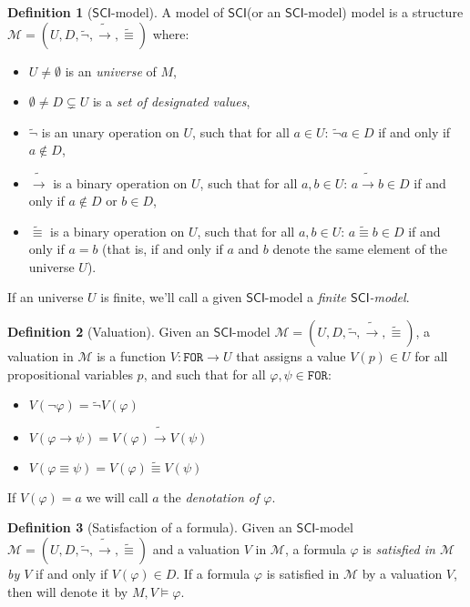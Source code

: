 \documentclass{article}
\theoremstyle{definition}
\newtheorem{definition}{Definition}[section]
\theoremstyle{definition}
\newcommand*{\id}{\equiv}
\newcommand*{\ra}{\rightarrow}
\newcommand*{\FOR}{\texttt{FOR}}
\newcommand{\SCI}{$\mathsf{SCI}$\xspace}
\begin{document}
\begin{definition}[\SCI-model]
    A model of \SCI (or an \SCI-model) model is a structure $\mathcal{M} = (U, D, \tilde{\lnot}, \tilde{\ra}, \tilde{\id})$ where:
    \begin{itemize}
        \item $U \not = \emptyset$ is an \emph{universe} of $M$,
        \item $\emptyset \not = D \subsetneq U$ is a \emph{set of designated values},
        \item $\tilde{\lnot}$ is an unary operation on $U$, such that for all $a \in U$: $\tilde{\lnot}a \in D$ if and only if $a \not \in D$,
        \item $\tilde{\ra}$ is a binary operation on $U$, such that for all $a, b \in U$: $a \tilde{\ra} b \in D$ if and only if $a \not \in D$ or $b \in D$,
        \item $\tilde{\id}$ is a binary operation on $U$, such that for all $a, b \in U$: $a \tilde{\id} b \in D$ if and only if $a = b$ (that is, if and only if $a$ and $b$ denote the same element of the universe $U$).
    \end{itemize}
    \label{model}
\end{definition}

If an universe $U$ is finite, we'll call a given \SCI-model a \emph{finite
    \SCI-model}.

\begin{definition}[Valuation]
    Given an \SCI-model $\mathcal{M} = (U, D, \tilde{\lnot}, \tilde{\ra}, \tilde{\id})$, a valuation in $\mathcal{M}$ is a function $V : \FOR \longrightarrow U$ that assigns a value $V(p) \in U$ for all propositional variables $p$, and such that for all $\varphi, \psi \in \FOR$:
    \begin{itemize}
        \item $V(\lnot \varphi) = \tilde{\lnot}V(\varphi)$
        \item $V(\varphi \ra \psi) = V(\varphi) \tilde{\ra} V(\psi)$
        \item $V(\varphi \id \psi) = V(\varphi) \tilde{\id} V(\psi)$
    \end{itemize}
    If $V(\varphi) = a$ we will call $a$ the \emph{denotation of $\varphi$}.
    \label{valuation}
\end{definition}

\begin{definition}[Satisfaction of a formula]
    Given an \SCI-model $\mathcal{M} = (U, D, \tilde{\lnot}, \tilde{\ra}, \tilde{\id})$ and a valuation $V$ in $\mathcal{M}$, a formula $\varphi$ is \emph{satisfied in $\mathcal{M}$ by $V$} if and only if $V(\varphi) \in D$. If a formula $\varphi$ is satisfied in $\mathcal{M}$ by a valuation $V$, then will denote it by $M, V \models \varphi$.
\end{definition}
\end{document}
